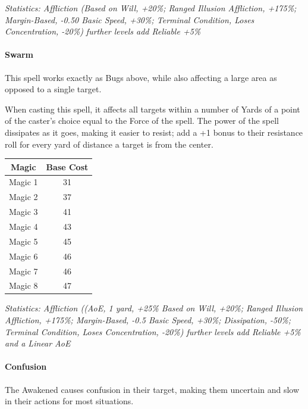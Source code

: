 \begin{multicols*}{3}
	\textcolor{OliveGreen}{\textit{Statistics: Affliction (Based on Will, +20\%; Ranged Illusion Affliction, +175\%; Margin-Based, -0.50 Basic Speed, +30\%; Terminal Condition, Loses Concentration, -20\%)  further levels add Reliable +5\%}}
	
	\paragraph{Swarm}
	
	This spell works exactly as Bugs above, while also affecting a large area as opposed to a single target.
	
	When casting this spell, it affects all targets within a number of Yards of a point of the caster's choice equal to the Force of the spell. The power of the spell dissipates as it goes, making it easier to resist; add a +1 bonus to their resistance roll for every yard of distance a target is from the center.
	
	\begin{center}
		\begin{tabular}{|c|c|}
			\hline
			Magic & Base Cost \\
			\hline
			\hline
			Magic 1 & 31 \\
			Magic 2 & 37 \\
			Magic 3 & 41 \\
			Magic 4 & 43 \\
			Magic 5 & 45 \\
			Magic 6 & 46 \\
			Magic 7 & 46 \\
			Magic 8 & 47 \\
			\hline
		\end{tabular}
	\end{center}
	
	\textcolor{OliveGreen}{\textit{Statistics: Affliction ((AoE, 1 yard, +25\% Based on Will, +20\%; Ranged Illusion Affliction, +175\%; Margin-Based, -0.5 Basic Speed, +30\%; Dissipation, -50\%; Terminal Condition, Loses Concentration, -20\%)  further levels add Reliable +5\% and a Linear AoE}}
	
	\paragraph{Confusion}
	
	The Awakened causes confusion in their target, making them uncertain and slow in their actions for most situations.
	

\end{multicols*}
